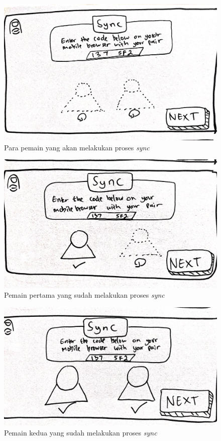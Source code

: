 \documentclass[a4paper,twoside]{article}
\begin{document}
\begin{enumerate}
		\begin{figure}[H]
			\centering
			\includegraphics[scale=0.1]{Gambar/web2_sync1}
			\caption{Para pemain yang akan melakukan proses \textit{sync}}
			\label{fig:2_web2_sync1}
		\end{figure}
	
		\begin{figure}[H]
			\centering
			\includegraphics[scale=0.1]{Gambar/web3_sync2}
			\caption{Pemain pertama yang sudah melakukan proses \textit{sync}}
			\label{fig:3_web3_sync2}
		\end{figure}
	
		\begin{figure}[H]
			\centering
			\includegraphics[scale=0.1]{Gambar/web4_sync3}
			\caption{Pemain kedua yang sudah melakukan proses \textit{sync}}
			\label{fig:4_web4_sync3}
		\end{figure}
	

\end{enumerate}
\end{document}
